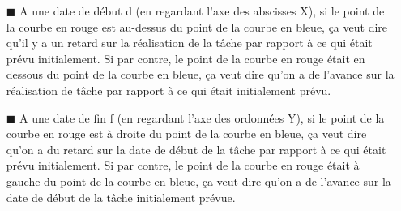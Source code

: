 \begin{itemize}
\item[\tiny{$\blacksquare$}]A une date de début d (en regardant l'axe des abscisses X), si le point de la courbe en rouge est au-dessus du point de la courbe en bleue,  ça veut dire qu'il y a un retard sur la réalisation de la tâche par rapport à ce qui était prévu initialement. Si par contre, le point de la courbe en rouge était en dessous du point de la courbe en bleue, ça veut dire qu'on a de l'avance sur la réalisation de tâche par rapport à ce qui était initialement prévu.
\item[\tiny{$\blacksquare$}]A une date de fin f (en regardant l'axe des ordonnées Y), si le point de la courbe en rouge est à droite du point de la courbe en bleue,  ça veut dire qu'on a du retard sur la date de début de la tâche par rapport à ce qui était prévu initialement. Si par contre, le point de la courbe en rouge était à gauche du point de la courbe en bleue, ça veut dire qu'on a de l'avance sur la date de début de la tâche initialement prévue.
\end{itemize}
